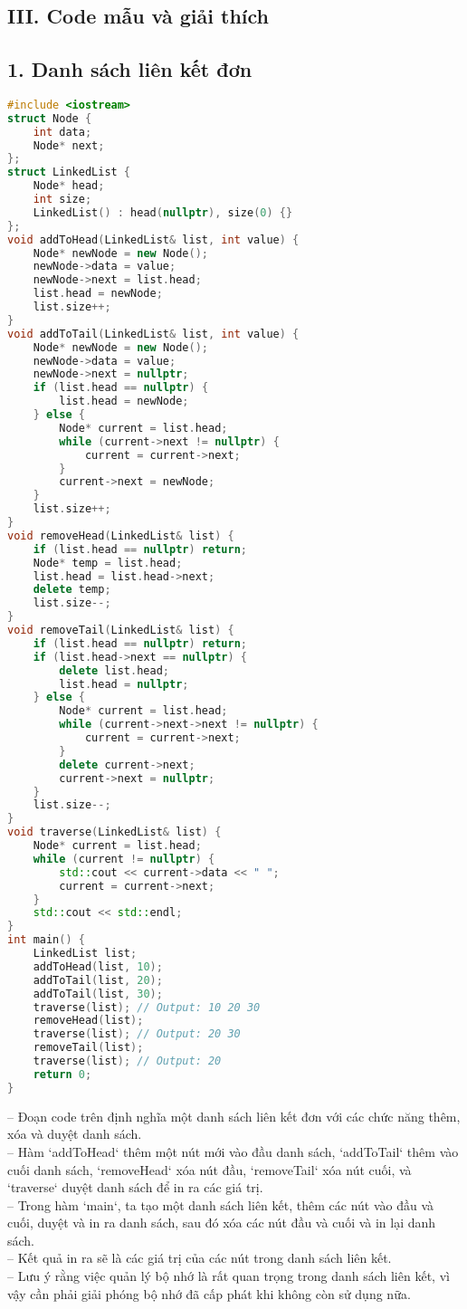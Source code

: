 \subsection*{III. Code mẫu và giải thích}
\subsection*{1. Danh sách liên kết đơn}
\begin{lstlisting}[language=C++]
#include <iostream>
struct Node {
    int data; 
    Node* next; 
};
struct LinkedList {
    Node* head; 
    int size;
    LinkedList() : head(nullptr), size(0) {} 
};
void addToHead(LinkedList& list, int value) {
    Node* newNode = new Node();
    newNode->data = value;
    newNode->next = list.head;
    list.head = newNode;
    list.size++;
}
void addToTail(LinkedList& list, int value) {
    Node* newNode = new Node();
    newNode->data = value;
    newNode->next = nullptr;
    if (list.head == nullptr) {
        list.head = newNode; 
    } else {
        Node* current = list.head;
        while (current->next != nullptr) {
            current = current->next; 
        }
        current->next = newNode;
    }
    list.size++;
}
void removeHead(LinkedList& list) {
    if (list.head == nullptr) return; 
    Node* temp = list.head;
    list.head = list.head->next;
    delete temp;
    list.size--;
}
void removeTail(LinkedList& list) {
    if (list.head == nullptr) return; 
    if (list.head->next == nullptr) { 
        delete list.head;
        list.head = nullptr;
    } else {
        Node* current = list.head;
        while (current->next->next != nullptr) {
            current = current->next; 
        }
        delete current->next; 
        current->next = nullptr; 
    }
    list.size--;
}
void traverse(LinkedList& list) {
    Node* current = list.head;
    while (current != nullptr) {
        std::cout << current->data << " ";
        current = current->next;
    }
    std::cout << std::endl;
}
int main() {
    LinkedList list;
    addToHead(list, 10);
    addToTail(list, 20);
    addToTail(list, 30);
    traverse(list); // Output: 10 20 30
    removeHead(list);
    traverse(list); // Output: 20 30
    removeTail(list);
    traverse(list); // Output: 20
    return 0;
}
\end{lstlisting}
\vspace{-3.5em}
-- Đoạn code trên định nghĩa một danh sách liên kết đơn với các chức năng thêm, xóa và duyệt danh sách.\\
-- Hàm `addToHead` thêm một nút mới vào đầu danh sách, `addToTail` thêm vào cuối danh sách, `removeHead` xóa nút đầu, `removeTail` xóa nút cuối, và `traverse` duyệt danh sách để in ra các giá trị.\\
-- Trong hàm `main`, ta tạo một danh sách liên kết, thêm các nút vào đầu và cuối, duyệt và in ra danh sách, sau đó xóa các nút đầu và cuối và in lại danh sách.\\
-- Kết quả in ra sẽ là các giá trị của các nút trong danh sách liên kết.\\
-- Lưu ý rằng việc quản lý bộ nhớ là rất quan trọng trong danh sách liên kết, vì vậy cần phải giải phóng bộ nhớ đã cấp phát khi không còn sử dụng nữa.
